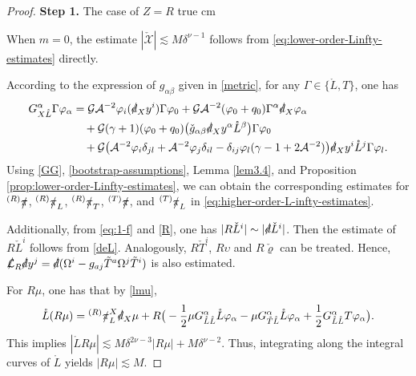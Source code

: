 \documentclass[11pt,twoside]{article}
\def\al{\alpha}
\def\vp{\varphi}
\def\Lies{\slashed{\mathcal{L}}}
\def\pis{\slashed{\pi}}
\begin{document}
\begin{proof}
 \textbf{Step 1.} The case of $Z = R$
  true cm

When $m = 0$, the estimate $|\check{\mathscr{X}}| \lesssim M\delta^{\nu-1}$ follows from \eqref{eq:lower-order-Linfty-estimates}
directly.

According to the expression of $g_{\alpha\beta}$ given in \eqref{metric}, for any $\Gamma \in \{\mathring{L}, T\}$, one has
\begin{equation}\label{GG}
\begin{split}
G_{X\mathring{L}}^\al \Gamma \vp_\al &= \mathcal{G} \mathcal{A}^{-2} \vp_i (\slashed{d}_X y^i) \Gamma \vp_0
+ \mathcal{G} \mathcal{A}^{-2} (\vp_0 + q_0) \Gamma^\alpha \slashed{d}_X \vp_\alpha \\
&\quad + \mathcal{G} (\gamma+ 1)(\vp_0 + q_0)
\big(\check{g}_{\alpha\beta} \slashed{d}_X y^\alpha \mathring{L}^\beta\big)\Gamma \vp_0 \\
&\quad + \mathcal{G} \big(\mathcal{A}^{-2} \vp_i \delta_{jl} + \mathcal{A}^{-2} \vp_j \delta_{il}
- \delta_{ij} \vp_l (\gamma-1+2\mathcal{A}^{-2})\big)
\slashed{d}_X y^i \mathring{L}^j \Gamma \vp_l.
\end{split}
\end{equation}
Using \eqref{GG}, \eqref{bootstrap-assumptions}, Lemma \ref{lem3.4}, and Proposition \ref{prop:lower-order-Linfty-estimates}, we can
obtain the corresponding estimates for ${}^{(R)}\pis$, ${}^{(R)}\pis_L$, ${}^{(R)}\pis_T$, ${}^{(T)}\pis$, and ${}^{(T)}\pis_L$
in \eqref{eq:higher-order-L-infty-estimates}.

Additionally, from \eqref{eq:1-f} and \eqref{R}, one has $|R\check{L}^i| \sim |\slashed{d}\check{L}^i|$.
Then the estimate of $R\check{L}^i$ follows from \eqref{deL}. Analogously, $R\check{T}^i$, $R\upsilon$ and $R\check{\varrho}$
can be treated. Hence, $\Lies_{R} \slashed{d} y^j = \slashed{d}(\Omega^i - g_{aj}\tilde{T}^a\Omega^j\tilde{T}^i)$ is also estimated.

For $R\mu$, one has that by \eqref{lmu},
\begin{equation*}
\mathring{L}(R\mu) = {}^{(R)}\slashed{\pi}_L^X \slashed{d}_X\mu + R\big(-\frac{1}{2}\mu G_{\mathring{L}\mathring{L}}^\al \mathring{L}\varphi_\al - \mu G_{\tilde{T}\mathring{L}}^\al \mathring{L}\varphi_\al + \frac{1}{2}G_{\mathring{L}\mathring{L}}^\al T\varphi_\al\big).
\end{equation*}
This implies $|\mathring{L}R\mu| \lesssim M\delta^{2\nu-3}|R\mu| + M\delta^{\nu-2}$. Thus,
integrating along the integral curves of $\mathring{L}$ yields $|R\mu| \lesssim M$.


\end{proof}
\end{document}
